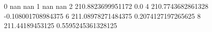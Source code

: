 0 nan nan
1 nan nan
2 210.8823699951172 0.0
4 210.7743682861328 -0.108001708984375
6 211.08978271484375 0.2074127197265625
8 211.44189453125 0.5595245361328125
